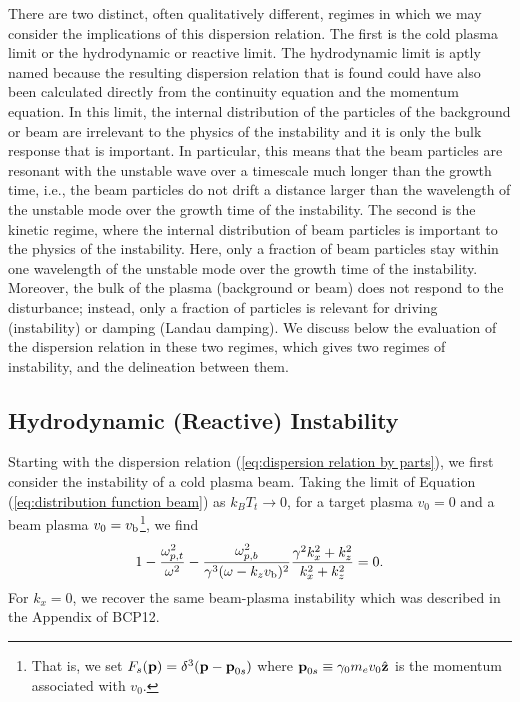 \documentclass[usenatbib,iop,apj,numberedappendix]{aeb_emulateapj_2015}
\newcommand\bmath[1] {\mbox{\boldmath$\rm #1$}}
\newcommand{\vbeam}{\ensuremath{v_{\rm b}}}
\begin{document}
There are two distinct, often qualitatively different, regimes in which we may
consider the implications of this dispersion relation.  The first is the cold
plasma limit or the hydrodynamic or reactive limit.  The hydrodynamic limit is
aptly named because the resulting dispersion relation that is found could have
also been calculated directly from the continuity equation and the momentum
equation.  In this limit, the internal distribution of the particles of the
background or beam are irrelevant to the physics of the instability and it is
only the bulk response that is important.  In particular, this means that the
beam particles are resonant with the unstable wave over a timescale much longer
than the growth time, i.e., the beam particles
do not drift a distance larger than the wavelength of the unstable mode over the
growth time of the instability.  The second is the kinetic regime, where the
internal distribution of  beam particles is
important to the physics of the instability. Here, only a fraction of
 beam particles stay within one wavelength of the unstable mode
over the growth time of the instability.  Moreover, the bulk of
the plasma (background or beam) does not respond to the disturbance; instead,
only a fraction of  particles is relevant for
driving (instability) or damping (Landau damping).  We discuss below the
evaluation of the dispersion relation in these two regimes, which gives two
regimes of instability, and the delineation between them. 

\subsection{Hydrodynamic (Reactive) Instability}

Starting with the dispersion relation (\ref{eq:dispersion relation by parts}), we first consider the instability of a cold plasma beam. 
Taking the limit of Equation (\ref{eq:distribution function beam}) as $k_BT_t  \rightarrow 0$, for a target plasma $v_0=0$ and a beam plasma $v_0=\vbeam$\footnote{That is, we set $F_s(\bmath{p})=\delta^3(\bmath{p}-\bmath{p}_{0s})$ where $\bmath{p}_{0s}\equiv \gamma_0 m_e v_0 \hat{\bmath{z}}$ is the momentum associated with $v_0$.}, we find
\begin{equation}\label{eq:dispersion relation reactive}
 1 - \frac{\omega_{p,t}^2}{\omega^2} - \frac{\omega_{p,b}^2}{\gamma^3(\omega-k_z \vbeam)^2}\frac{\gamma^2 k_x^2 + k_z^2}{k_x^2 + k_z^2} = 0.
\end{equation}
For $k_x = 0$, we recover the same beam-plasma instability which was described in the Appendix of BCP12.  
\end{document}
